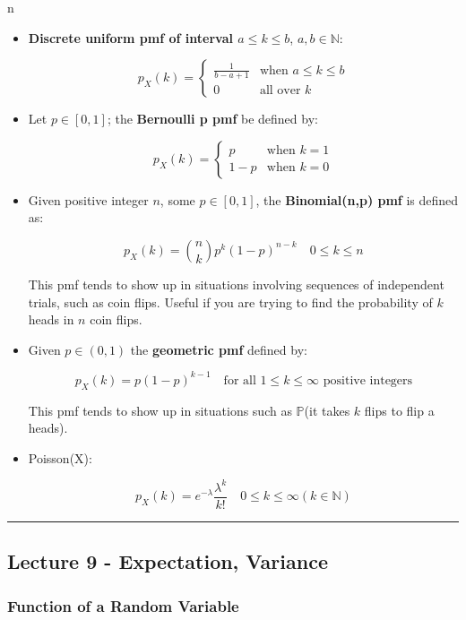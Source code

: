 n\documentclass{article}
\begin{document}
\begin{itemize}
\item \textbf{Discrete uniform pmf of interval $a \leq k \leq b$},
  $a, b \in \mathbb{N}$:
  
  \[
    p_X(k) =
    \begin{cases}
      \frac{1}{b - a + 1} & \text{when } a \leq k \leq b \\
      0 & \text{all over } k
    \end{cases}
  \]

\item Let $p \in [0,1]$; the \textbf{Bernoulli p pmf} be defined by:
  
  \[
    p_X(k) =
    \begin{cases}
      p & \text{when } k = 1 \\
      1 - p & \text{when } k = 0
    \end{cases}
  \]
    
\item Given positive integer $n$, some $p \in [0,1]$, the
  \textbf{Binomial(n,p) pmf} is defined as:

  \[
    p_X(k) = {n \choose k} p^k (1 - p)^{n-k} \quad 0 \leq k \leq n
  \]

  This pmf tends to show up in situations involving sequences of
  independent trials, such as coin flips. Useful if you are trying to
  find the probability of $k$ heads in $n$ coin flips.

\item Given $p \in (0, 1)$ the \textbf{geometric pmf} defined by:

  \[
    p_X(k) = p (1-p)^{k-1} \quad \text{for all } 1 \leq k \leq \infty
    \text{ positive integers}
  \]

  This pmf tends to show up in situations such as $\mathbb{P}$(it
  takes $k$ flips to flip a heads).

\item Poisson(X):

  \[
    p_X(k) = e^{-\lambda} \frac{\lambda^{k}}{k!} \quad 0 \leq k \leq
    \infty (k \in \mathbb{N})
  \]
\end{itemize}


\medskip\hrule
\subsection{Lecture 9 - Expectation, Variance}

\subsubsection{Function of a Random Variable}
\end{document}
